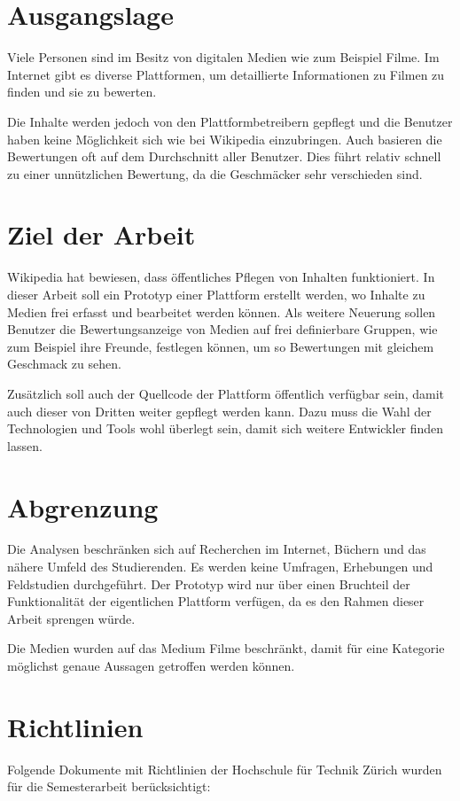 \section{Ausgangslage}
Viele Personen sind im Besitz von digitalen Medien wie zum Beispiel Filme.
Im Internet gibt es diverse Plattformen, um detaillierte Informationen zu 
Filmen zu finden und sie zu bewerten. 

Die Inhalte werden jedoch von den Plattformbetreibern gepflegt und die 
Benutzer haben keine Möglichkeit sich wie bei Wikipedia einzubringen. Auch 
basieren die Bewertungen oft auf dem Durchschnitt aller Benutzer. Dies
führt relativ schnell zu einer unnützlichen Bewertung, da die Geschmäcker
sehr verschieden sind.

\section{Ziel der Arbeit}
Wikipedia hat bewiesen, dass öffentliches Pflegen von Inhalten 
funktioniert. In dieser Arbeit soll ein Prototyp einer Plattform erstellt
werden, wo Inhalte zu Medien frei erfasst und bearbeitet werden können.
Als weitere Neuerung sollen Benutzer die Bewertungsanzeige von Medien auf
frei definierbare Gruppen, wie zum Beispiel ihre Freunde, festlegen 
können, um so Bewertungen mit gleichem Geschmack zu sehen.

Zusätzlich soll auch der Quellcode der Plattform öffentlich verfügbar sein, 
damit auch dieser von Dritten weiter gepflegt werden kann. Dazu muss die 
Wahl der Technologien und Tools wohl überlegt sein, damit sich weitere 
Entwickler finden lassen.

\section{Abgrenzung}
Die Analysen beschränken sich auf Recherchen im Internet, Büchern und das 
nähere Umfeld des Studierenden. Es werden keine Umfragen, Erhebungen und 
Feldstudien durchgeführt. Der Prototyp wird nur über einen Bruchteil der 
Funktionalität der eigentlichen Plattform verfügen, da es den Rahmen
dieser Arbeit sprengen würde.

Die Medien wurden auf das Medium Filme beschränkt, damit für eine 
Kategorie möglichst genaue Aussagen getroffen werden können.

\section{Richtlinien}
Folgende Dokumente mit Richtlinien der Hochschule für Technik Zürich 
wurden für die Semesterarbeit berücksichtigt:

